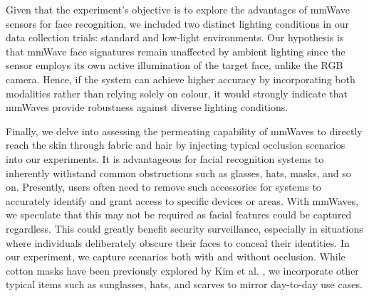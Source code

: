 \documentclass{mpaper}
\begin{document}
Given that the experiment's objective is to explore the advantages of mmWave sensors for face recognition, we included two distinct lighting conditions in our data collection trials: standard and low-light environments. Our hypothesis is that mmWave face signatures remain unaffected by ambient lighting since the sensor employs its own active illumination of the target face, unlike the RGB camera. Hence, if the system can achieve higher accuracy by incorporating both modalities rather than relying solely on colour, it would strongly indicate that mmWaves provide robustness against diverse lighting conditions.

Finally, we delve into assessing the permeating capability of mmWaves to directly reach the skin through fabric and hair by injecting typical occlusion scenarios into our experiments. It is advantageous for facial recognition systems to inherently withstand common obstructions such as glasses, hats, masks, and so on. Presently, users often need to remove such accessories for systems to accurately identify and grant access to specific devices or areas. With mmWaves, we speculate that this may not be required as facial features could be captured regardless. This could greatly benefit security surveillance, especially in situations where individuals deliberately obscure their faces to conceal their identities. In our experiment, we capture scenarios both with and without occlusion. While cotton masks have been previously explored by Kim et al. \cite{kim2020face}, we incorporate other typical items such as sunglasses, hats, and scarves to mirror day-to-day use cases.
\end{document}
